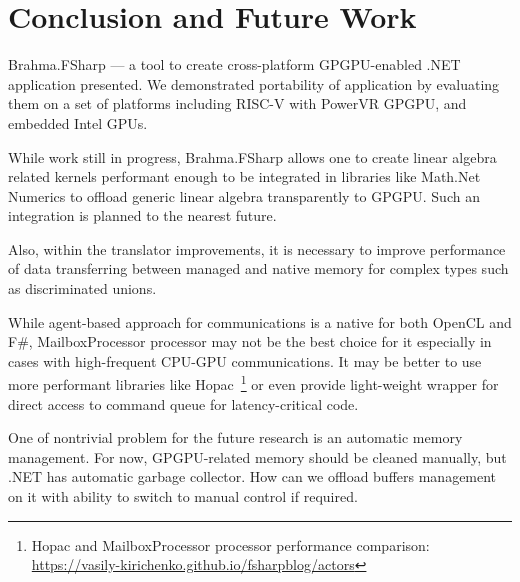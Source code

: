 \section{Conclusion and Future Work}

Brahma.FSharp --- a tool to create cross-platform GPGPU-enabled .NET application presented. 
We demonstrated portability of application by evaluating them on a set of platforms including RISC-V with PowerVR GPGPU, and embedded Intel GPUs.

While work still in progress, Brahma.FSharp allows one to create linear algebra related kernels performant enough to be integrated in libraries like Math.Net Numerics to offload generic linear algebra transparently to GPGPU.
Such an integration is planned to the nearest future.

Also, within the translator improvements, it is necessary to improve performance of data transferring between managed and native memory for complex types such as discriminated unions.

While agent-based approach for communications is a native for both OpenCL and F\#, MailboxProcessor processor may not be the best choice for it especially in cases with high-frequent CPU-GPU communications.
It may be better to use more performant libraries like Hopac~\footnote{Hopac and MailboxProcessor processor performance comparison: \url{https://vasily-kirichenko.github.io/fsharpblog/actors}} or even provide light-weight wrapper for direct access to command queue for latency-critical code.

One of nontrivial problem for the future research is an automatic memory management.
For now, GPGPU-related memory should be cleaned manually, but .NET has automatic garbage collector. 
How can we offload buffers management on it with ability to switch to manual control if required. 
